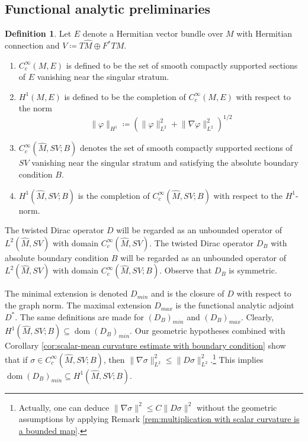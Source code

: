 \documentclass[12pt, reqno]{amsart}
\theoremstyle{plain} %
\theoremstyle{definition}
\newtheorem{definition}[theorem]{Definition}
\theoremstyle{remark}
\numberwithin{equation}{section}
\newcommand{\dom}[1]{\hat{#1}}
\newcommand{\norm}[1]{\lVert #1 \rVert}
\DeclareMathOperator{\operdom}{dom}
\begin{document}
\subsection{Functional analytic preliminaries}\label{subsec:functional analytic preliminaries}
\begin{definition}\label{def:spaces of functions} \mbox{}
    Let \(E\) denote a Hermitian vector bundle over \(M\) with Hermitian connection and \(V \coloneqq T\dom{M} \oplus F^*TM\).
    \begin{enumerate}
        \item \(C_c^\infty(M, E)\) is defined to be the set of smooth compactly supported sections of \(E\) vanishing near the singular stratum.
        \item \(H^1(M, E)\) is defined to be the completion of \(C_c^\infty(M, E)\) with respect to the norm
        \begin{equation*}
            \norm{\varphi}_{H^1}\coloneqq (\norm{\varphi}_{L^2}^2+\norm{\nabla\varphi}_{L^2}^2)^{1/2}
        \end{equation*}
        \item \(C_c^{\infty}(\dom{M}, SV; B)\) denotes the set of smooth compactly supported sections of \(SV\) vanishing near the singular stratum and satisfying the absolute boundary condition \(B\).
        \item \(H^1(\dom{M}, SV; B)\) is the completion of \(C_c^\infty(\dom{M}, SV; B)\) with respect to the \(H^1\)-norm.
    \end{enumerate}
\end{definition}
The twisted Dirac operator \(D\) will be regarded as an unbounded operator of \(L^2(\dom{M}, SV)\) with domain \(C_c^{\infty}(\dom{M}, SV)\).
The twisted Dirac operator \(D_B\) with absolute boundary condition \(B\) will be regarded as an unbounded operator of \(L^2(\dom{M}, SV)\) with domain \(C_c^{\infty}(\dom{M}, SV; B)\).
Observe that \(D_B\) is symmetric.

The minimal extension is denoted \(D_{min}\) and is the closure of \(D\) with respect to the graph norm.
The maximal extension \(D_{max}\) is the functional analytic adjoint \(D^*\). The same definitions are made for \((D_B)_{min}\) and \((D_B)_{max}\). Clearly, \(H^1(\dom{M}, SV; B) \subseteq \operdom(D_B)_{min}\).
Our geometric hypotheses combined with Corollary \ref{cor:scalar-mean curvature estimate with boundary condition} show that if \(\sigma \in C_c^{\infty}(\dom{M}, SV; B)\), then \(\norm{\nabla \sigma}_{L^2}^2 \leq \norm{D \sigma}_{L^2}^2\).\footnote{Actually, one can deduce \(\norm{\nabla \sigma}^2 \leq C\norm{D \sigma}^2\) without the geometric assumptions by applying Remark \ref{rem:multiplication with scalar curvature is a bounded map}.}
This implies \(\operdom(D_B)_{min} \subseteq H^1(\dom{M}, SV; B)\).
\end{document}
